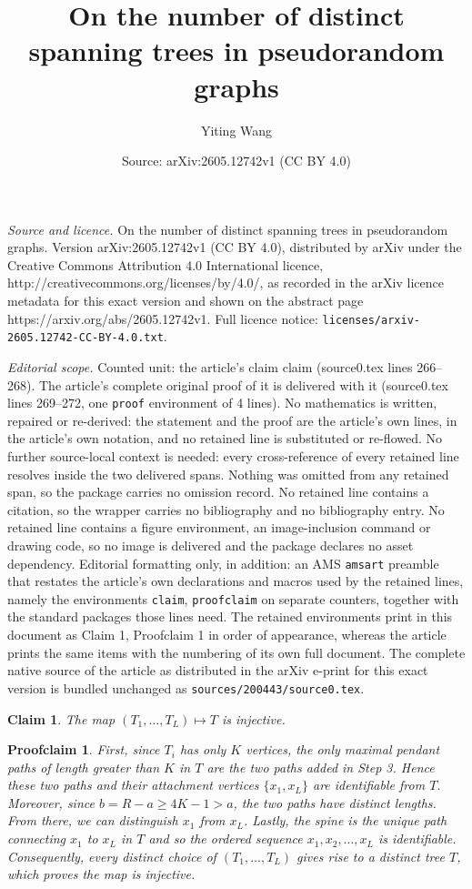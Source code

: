 \documentclass[10pt,a4paper]{amsart}
\title{On the number of distinct spanning trees in pseudorandom graphs}
\author{Yiting Wang}
\date{Source: arXiv:2605.12742v1 (CC BY 4.0)}
\newtheorem{claim}{Claim}
\newtheorem{proofclaim}{Proofclaim}
\begin{document}
\maketitle

\noindent\emph{Source and licence.} On the number of distinct spanning trees in pseudorandom graphs. Version arXiv:2605.12742v1 (CC BY 4.0), distributed by arXiv under the Creative Commons Attribution 4.0 International licence, http://creativecommons.org/licenses/by/4.0/, as recorded in the arXiv licence metadata for this exact version and shown on the abstract page https://arxiv.org/abs/2605.12742v1. Full licence notice: \texttt{licenses/arxiv-2605.12742-CC-BY-4.0.txt}.\par\smallskip

\noindent\textit{Editorial scope.} Counted unit: the article's claim claim (source0.tex lines 266--268). The article's complete original proof of it is delivered with it (source0.tex lines 269--272, one \texttt{proof} environment of 4 lines). No mathematics is written, repaired or re-derived: the statement and the proof are the article's own lines, in the article's own notation, and no retained line is substituted or re-flowed.  No further source-local context is needed: every cross-reference of every retained line resolves inside the two delivered spans.  Nothing was omitted from any retained span, so the package carries no omission record.  No retained line contains a citation, so the wrapper carries no bibliography and no bibliography entry.  No retained line contains a figure environment, an image-inclusion command or drawing code, so no image is delivered and the package declares no asset dependency.  Editorial formatting only, in addition: an AMS \texttt{amsart} preamble that restates the article's own declarations and macros used by the retained lines, namely the environments \texttt{claim}, \texttt{proofclaim} on separate counters, together with the standard packages those lines need.  The retained environments print in this document as Claim 1, Proofclaim 1 in order of appearance, whereas the article prints the same items with the numbering of its own full document.  The complete native source of the article as distributed in the arXiv e-print for this exact version is bundled unchanged as \texttt{sources/200443/source0.tex}.
    \begin{claim}
        The map $(T_1,\dots, T_L)\mapsto T$ is injective.
    \end{claim}

    \begin{proofclaim}
        First, since $T_i$ has only $K$ vertices, the only maximal pendant paths of length greater than $K$ in $T$ are the two paths added in Step 3. Hence these two paths and their attachment vertices $\{x_1,x_L\}$ are identifiable from $T$.
        Moreover, since $b = R-a \geq 4K-1> a$, the two paths have distinct lengths. From there, we can distinguish $x_1$ from $x_L$. Lastly, the spine is the unique path connecting $x_1$ to $x_L$ in $T$ and so the ordered sequence $x_1,x_2,\dots, x_L$ is identifiable. Consequently, every distinct choice of $(T_1,\dots, T_L)$ gives rise to a distinct tree $T$, which proves the map is injective.
    \end{proofclaim}
\end{document}

